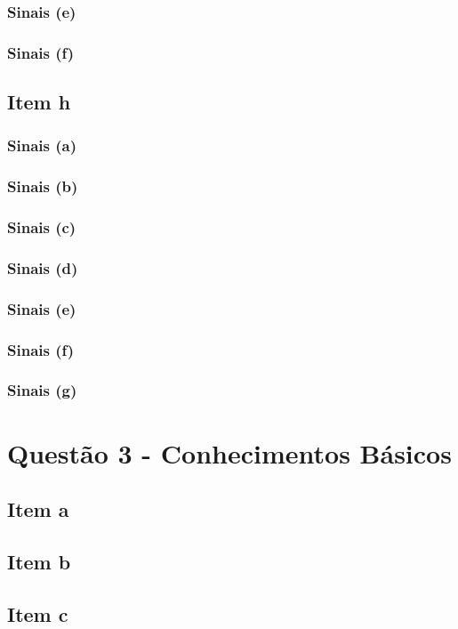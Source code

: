 \documentclass[a4paper, 12pt]{article}
\begin{document}
            \subsubsection{Sinais (e)}
            \subsubsection{Sinais (f)}
        \subsection{Item h}
            \subsubsection{Sinais (a)}
            \subsubsection{Sinais (b)}
            \subsubsection{Sinais (c)}
            \subsubsection{Sinais (d)}
            \subsubsection{Sinais (e)}
            \subsubsection{Sinais (f)}
            \subsubsection{Sinais (g)}
    \section{Quest\~{a}o 3 - Conhecimentos Básicos}
        \subsection{Item a}
        \subsection{Item b}
        \subsection{Item c}
\end{document}
